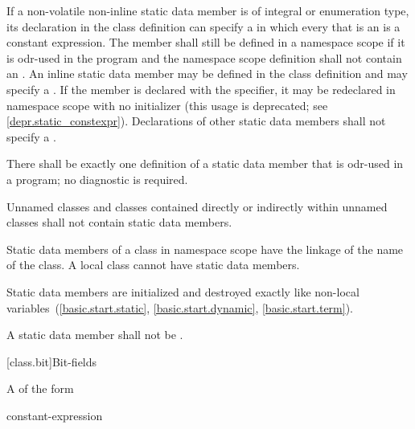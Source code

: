 \pnum
If a non-volatile non-inline  static data member is
of integral or enumeration type,
its declaration in the class definition can specify a
 in which every
 that is an 
is a constant expression.
The member shall still be defined in a namespace scope if
it is odr-used in the program and the
namespace scope definition shall not contain an .
An inline static data member may be defined in the class definition
and may specify a . If the
member is declared with the  specifier, it may be
redeclared in namespace scope with no initializer (this usage is
deprecated; see \ref{depr.static_constexpr}). Declarations of other
static data members shall not specify a .

\pnum
\begin{note}
There shall be exactly one definition of a static data member
that is odr-used in a program; no diagnostic is required.
\end{note}
Unnamed classes and classes contained directly
or indirectly within unnamed classes shall not contain static
data members.

\pnum
\begin{note}
Static data members of a class in namespace scope have the linkage of the name of the class.
A local class cannot have static data members.
\end{note}

\pnum
Static data members are initialized and destroyed exactly like
non-local variables~(\ref{basic.start.static}, \ref{basic.start.dynamic},
\ref{basic.start.term}).

\pnum
A static data member shall not be
.

[class.bit]{Bit-fields}%

\pnum
A  of the form

\begin{ncsimplebnf}
  \terminal{:} constant-expression 
\end{ncsimplebnf}

